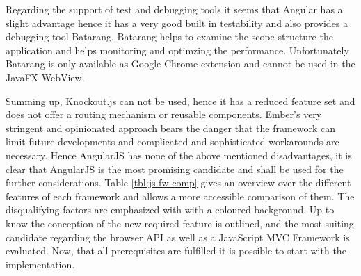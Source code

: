 Regarding the support of test and debugging tools it seems that Angular has a slight advantage hence it has a very good built in testability and also provides a debugging tool Batarang. Batarang helps to examine the scope structure the application and helps monitoring and optimzing the performance. Unfortunately Batarang is only available as Google Chrome extension and cannot be used in the JavaFX WebView.

Summing up, Knockout.js can not be used, hence it has a reduced feature set and does not offer a routing mechanism or reusable components. Ember's very stringent and opinionated approach bears the danger that the framework can limit future developments and complicated and sophisticated workarounds are necessary. Hence AngularJS has none of the above mentioned disadvantages, it is clear that AngularJS is the most promising candidate and shall be used for the further considerations. Table \ref{tbl:js-fw-comp} gives an overview over the different features of each framework and allows a more accessible comparison of them. The disqualifying factors are emphasized with with a coloured background. Up to know the conception of the new required feature is outlined, and the most suiting candidate regarding the browser API as well as a JavaScript MVC Framework is evaluated. Now, that all prerequisites are fulfilled it is possible to start with the implementation. 



\label{tbl:js-fw-comp}

